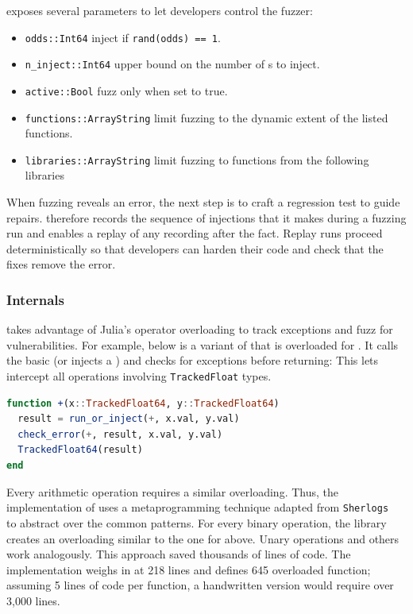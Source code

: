 \documentclass{juliacon}
\begin{document}
\FT{} exposes several parameters to let developers control the fuzzer:

\begin{itemize}
\item \texttt{odds::Int64} inject if \texttt{rand(odds) == 1}.
\item \texttt{n\_inject::Int64} upper bound on the number of \Nan{}s to inject.
\item \texttt{active::Bool} fuzz only when set to true.
\item \texttt{functions::Array{String}} limit fuzzing to the dynamic extent of the listed functions.
\item \texttt{libraries::Array{String}} limit fuzzing to functions from the following libraries
\end{itemize}

When fuzzing reveals an error, the next step is to craft a regression test to
guide repairs.
\FT{} therefore records the sequence of injections that it makes during a fuzzing
run and enables a replay of any recording after the fact.
Replay runs proceed deterministically so that developers can harden
their code and check that the fixes remove the error.


\subsubsection{\FT{} Internals}

\FT{} takes advantage of Julia's operator overloading to track exceptions and
fuzz for vulnerabilities.
For example, below is a variant of \code{+} that is overloaded
for .
It calls the basic \code{+} (or injects a \Nan{}) and checks for exceptions
before returning:
This lets \FT{} intercept all \fp{} operations involving \texttt{TrackedFloat} types.

\begin{lstlisting}[language = Julia]
function +(x::TrackedFloat64, y::TrackedFloat64)
  result = run_or_inject(+, x.val, y.val)
  check_error(+, result, x.val, y.val)
  TrackedFloat64(result)
end
\end{lstlisting}

Every arithmetic operation requires a similar overloading.
Thus, the implementation of \FT{} uses a metaprogramming technique
adapted from \texttt{Sherlogs}~\cite{kMilanklSherlogsJl2021}
to abstract over the common patterns.
For every binary operation, the library creates an overloading similar
to the one for \code{+} above.
Unary operations and others work analogously.
This approach saved thousands of lines of code.
The implementation weighs in at 218 lines and defines 645 overloaded function;
assuming 5 lines of code per function, a handwritten version would require over 3,000 lines.
\end{document}
